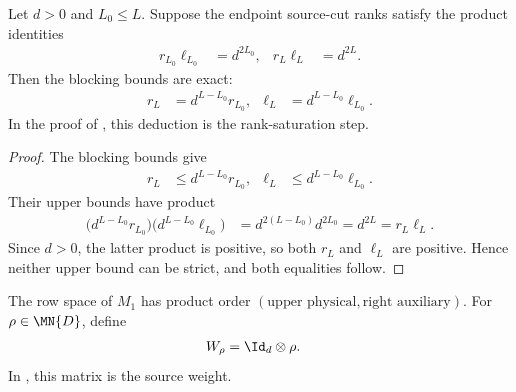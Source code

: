 \begin{lemma}
    \label{thm:mpu_source_cut_rank_blocking_saturation}
    \leanok
    Let $d>0$ and $L_0\leq L$. Suppose the endpoint source-cut ranks satisfy
    the product identities
    \begin{align}
        r_{L_0}\ell_{L_0} & =d^{2L_0}, &
        r_L\ell_L         & =d^{2L}.
    \end{align}
    Then the blocking bounds are exact:
    \begin{align}
        r_L    & =d^{L-L_0}r_{L_0},    &
        \ell_L & =d^{L-L_0}\ell_{L_0}.
    \end{align}
    In the proof of \cite[Proposition~IV.2]{Cirac2017MPU}, this deduction is the rank-saturation
    step.
\end{lemma}

\begin{proof}\leanok
    The blocking bounds give
    \begin{align}
        r_L    & \leq d^{L-L_0}r_{L_0},    &
        \ell_L & \leq d^{L-L_0}\ell_{L_0}.
    \end{align}
    Their upper bounds have product
    \begin{align}
        \bigl(d^{L-L_0}r_{L_0}\bigr)
        \bigl(d^{L-L_0}\ell_{L_0}\bigr)
         & =d^{2(L-L_0)}d^{2L_0}=d^{2L}=r_L\ell_L.
    \end{align}
    Since $d>0$, the latter product is positive, so both $r_L$ and $\ell_L$
    are positive. Hence neither upper bound can be strict, and both equalities
    follow.
\end{proof}

\begin{definition}
    \label{def:mpu_source_weight}
    \leanok
    The row space of $M_1$ has product order
    $(\text{upper physical},\text{right auxiliary})$. For
    $\rho\in\MN{D}$, define
    \begin{align}
        W_\rho & =\Id_d\otimes\rho.
    \end{align}
    In \cite[equation labelled~\texttt{Y1Y1X1X1}]{Cirac2017MPU}, this matrix is the source
    weight.
\end{definition}

